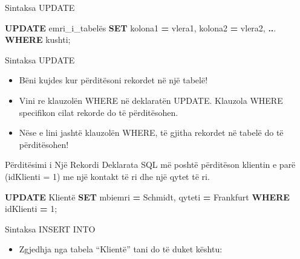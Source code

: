 \documentclass[
  ignorenonframetext,
]{beamer}
\newenvironment{Shaded}{\begin{snugshade}}{\end{snugshade}}
\newcommand{\DecValTok}[1]{\textcolor[rgb]{0.00,0.00,0.81}{#1}}
\newcommand{\KeywordTok}[1]{\textcolor[rgb]{0.13,0.29,0.53}{\textbf{#1}}}
\newcommand{\NormalTok}[1]{#1}
\newcommand{\OperatorTok}[1]{\textcolor[rgb]{0.81,0.36,0.00}{\textbf{#1}}}
\newcommand{\StringTok}[1]{\textcolor[rgb]{0.31,0.60,0.02}{#1}}
\providecommand{\tightlist}{%
  \setlength{\itemsep}{0pt}\setlength{\parskip}{0pt}}
\begin{document}
\begin{frame}[fragile]{Sintaksa UPDATE}
\label{sintaksa-update}
\begin{Shaded}
\begin{Highlighting}[]
\KeywordTok{UPDATE}\NormalTok{ emri\_i\_tabelës}
\KeywordTok{SET}\NormalTok{ kolona1 }\OperatorTok{=}\NormalTok{ vlera1, kolona2 }\OperatorTok{=}\NormalTok{ vlera2, }\OperatorTok{..}\NormalTok{.}
\KeywordTok{WHERE}\NormalTok{ kushti;}
\end{Highlighting}
\end{Shaded}
\end{frame}

\begin{frame}{Sintaksa UPDATE}
\label{sintaksa-update-1}
\begin{itemize}
\item
  Bëni kujdes kur përditësoni rekordet në një tabelë!
\item
  Vini re klauzolën WHERE në deklaratën UPDATE. Klauzola WHERE
  specifikon cilat rekorde do të përditësohen.
\item
  Nëse e lini jashtë klauzolën WHERE, të gjitha rekordet në tabelë do të
  përditësohen!
\end{itemize}
\end{frame}

\begin{frame}[fragile]{Përditësimi i Një Rekordi}
\label{puxebrdituxebsimi-i-njuxeb-rekordi}
Deklarata SQL më poshtë përditëson klientin e parë (idKlienti = 1) me
një kontakt të ri dhe një qytet të ri.


\begin{Shaded}
\begin{Highlighting}[]
\KeywordTok{UPDATE}\NormalTok{ Klientë}
\KeywordTok{SET}\NormalTok{ mbiemri }\OperatorTok{=} \StringTok{\textquotesingle{}Schmidt\textquotesingle{}}\NormalTok{, qyteti }\OperatorTok{=} \StringTok{\textquotesingle{}Frankfurt\textquotesingle{}}
\KeywordTok{WHERE}\NormalTok{ idKlienti }\OperatorTok{=} \DecValTok{1}\NormalTok{;}
\end{Highlighting}
\end{Shaded}
\end{frame}

\begin{frame}{Sintaksa INSERT INTO}
\label{sintaksa-insert-into-6}
\begin{itemize}
\tightlist
\item
  Zgjedhja nga tabela ``Klientë'' tani do të duket kështu:
\end{itemize}
\end{frame}
\end{document}

